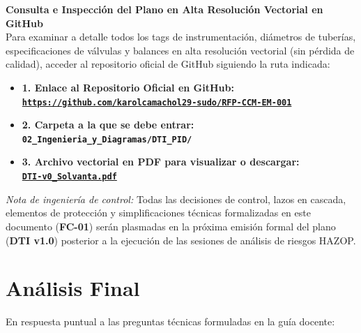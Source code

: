 \documentclass[10pt,letterpaper]{article}
\begin{document}
\begin{tcolorbox}[colframe=navyblue,colback=boxbg,arc=2mm,boxrule=0.8pt]
    \textbf{\color{navyblue}\large Consulta e Inspección del Plano en Alta Resolución Vectorial en GitHub}\\[3pt]
    Para examinar a detalle todos los tags de instrumentación, diámetros de tuberías, especificaciones de válvulas y balances en alta resolución vectorial (sin pérdida de calidad), acceder al repositorio oficial de GitHub siguiendo la ruta indicada:
    \vspace{0.15cm}
    \begin{itemize}
        \item \textbf{1. Enlace al Repositorio Oficial en GitHub:} \\
        \href{https://github.com/karolcamachol29-sudo/RFP-CCM-EM-001}{\texttt{\textbf{https://github.com/karolcamachol29-sudo/RFP-CCM-EM-001}}}
        \item \textbf{2. Carpeta a la que se debe entrar:} \\
        \texttt{\textbf{02\_Ingenieria\_y\_Diagramas/DTI\_PID/}}
        \item \textbf{3. Archivo vectorial en PDF para visualizar o descargar:} \\
        \href{https://github.com/karolcamachol29-sudo/RFP-CCM-EM-001/blob/main/02_Ingenieria_y_Diagramas/DTI_PID/DTI-v0_Solvanta.pdf}{\texttt{\textbf{DTI-v0\_Solvanta.pdf}}}
    \end{itemize}
    \vspace{0.1cm}
    \footnotesize \textit{Nota de ingeniería de control:} Todas las decisiones de control, lazos en cascada, elementos de protección y simplificaciones técnicas formalizadas en este documento (\textbf{FC-01}) serán plasmadas en la próxima emisión formal del plano (\textbf{DTI v1.0}) posterior a la ejecución de las sesiones de análisis de riesgos HAZOP.
\end{tcolorbox}

\newpage
\section{Análisis Final}
En respuesta puntual a las preguntas técnicas formuladas en la guía docente:
\end{document}
